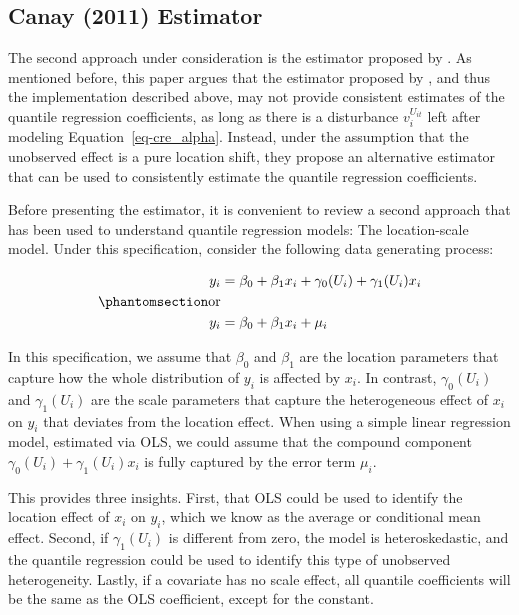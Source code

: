 \documentclass[bib]{statapress}
\begin{document}
\subsection{Canay (2011) Estimator}\label{sec-canay}

The second approach under consideration is the estimator proposed by
\citet{canay2011}. As mentioned before, this paper argues that the
estimator proposed by \citet{abrevaya2008}, and thus the implementation
described above, may not provide consistent estimates of the quantile
regression coefficients, as long as there is a disturbance
\(v^{U_{it}}_i\) left after modeling Equation~\ref{eq-cre_alpha}.
Instead, under the assumption that the unobserved effect is a pure
location shift, they propose an alternative estimator that can be used
to consistently estimate the quantile regression coefficients.

Before presenting the estimator, it is convenient to review a second
approach that has been used to understand quantile regression models:
The location-scale model. Under this specification, consider the
following data generating process:

\begin{equation}\phantomsection\label{eq-loc-scale}{\begin{aligned}
y_i &= \beta_0+\beta_1 x_i + \gamma_0(U_i) + \gamma_1(U_i) x_{i} \\ \text{or}\\
y_i &= \beta_0+\beta_1 x_i + \mu_i
\end{aligned}
}\end{equation}

In this specification, we assume that \(\beta_0\) and \(\beta_1\) are
the location parameters that capture how the whole distribution of
\(y_i\) is affected by \(x_i\). In contrast, \(\gamma_0(U_i)\) and
\(\gamma_1(U_i)\) are the scale parameters that capture the
heterogeneous effect of \(x_i\) on \(y_i\) that deviates from the
location effect. When using a simple linear regression model, estimated
via OLS, we could assume that the compound component
\(\gamma_0(U_i) + \gamma_1(U_i) x_{i}\) is fully captured by the error
term \(\mu_i\).

This provides three insights. First, that OLS could be used to identify
the location effect of \(x_i\) on \(y_i\), which we know as the average
or conditional mean effect. Second, if \(\gamma_1(U_i)\) is different
from zero, the model is heteroskedastic, and the quantile regression
could be used to identify this type of unobserved heterogeneity. Lastly,
if a covariate has no scale effect, all quantile coefficients will be
the same as the OLS coefficient, except for the constant.
\end{document}
